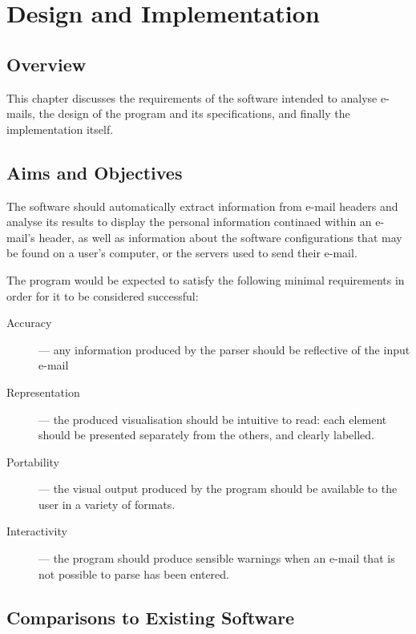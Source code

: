 \chapter{Design and Implementation}\label{chap:imp}

\section{Overview}

This chapter discusses the requirements of the software intended to analyse e-mails, the design of the program and its specifications, and finally the implementation itself.


    \section{Aims and Objectives}

    The software should
    automatically extract information from e-mail headers and analyse its results to
    display the personal information continaed within an e-mail's header, as well as
    information about the software configurations that may be found on a user's
    computer, or the servers used to send their e-mail.

    The program would be expected to satisfy the following minimal requirements
    in order for it to be considered successful: \begin{description} \item
    [{Accuracy}] --- any information produced by the parser should be reflective
    of the input e-mail

    \item [{Representation}] --- the produced visualisation should be intuitive
    to read: each element should be presented separately from the others, and
    clearly labelled.

    \item [{Portability}] --- the visual output produced by the program should
    be available to the user in a variety of formats.

    \item [{Interactivity}] --- the program should produce sensible warnings
    when an e-mail that is not possible to parse has been entered.
  \end{description}

  \section{Comparisons to Existing Software}

